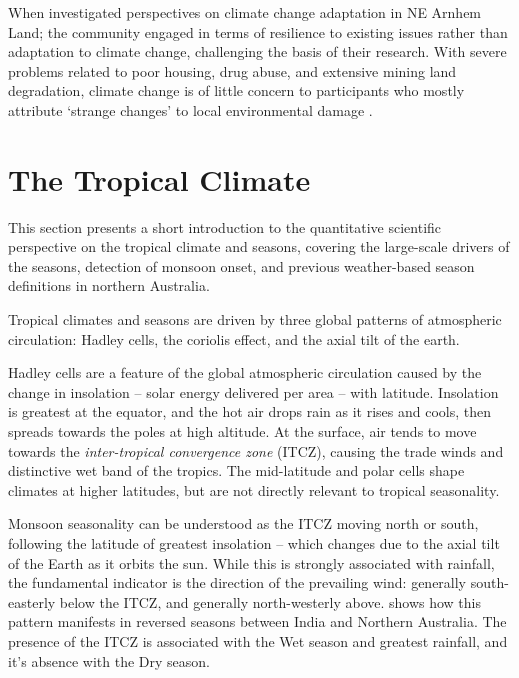 
When \citet{petheram2010} investigated perspectives on climate change
adaptation in NE Arnhem Land; the community engaged in terms of resilience to
existing issues rather than adaptation to climate change, challenging the basis
of their research.  With severe problems related to poor housing, drug abuse,
and extensive mining land degradation, climate change is of little concern to
participants who mostly attribute `strange changes' to local environmental
damage \citep{green2010a}.




\section{The Tropical Climate}
\label{sec:lit-tropical-climate}

This section presents a short introduction to the quantitative scientific
perspective on the tropical climate and seasons, covering the large-scale
drivers of the seasons, detection of monsoon onset, and previous
weather-based season definitions in northern Australia.


Tropical climates and seasons are driven by three global patterns of
atmospheric circulation:  Hadley cells, the coriolis effect, and the axial
tilt of the earth.

Hadley cells are a feature of the global atmospheric circulation
caused by the change in insolation -- solar energy delivered per area --
with latitude.  Insolation is greatest at the equator, and the hot air drops
rain as it rises and cools, then spreads towards the poles at high altitude.
At the surface, air tends to move towards the \textit{inter-tropical
convergence zone} (ITCZ), causing the trade winds and distinctive wet band
of the tropics.  The mid-latitude and polar cells shape climates at higher
latitudes, but are not directly relevant to tropical seasonality.

Monsoon seasonality can be understood as the ITCZ moving north or south,
following the latitude of greatest insolation -- which changes due to the
axial tilt of the Earth as it orbits the sun.  While this is strongly
associated with rainfall, the fundamental indicator is the direction of
the prevailing wind: generally south-easterly below the ITCZ, and generally
north-westerly above.   shows how this pattern
manifests in reversed seasons between India and Northern Australia.
The presence of the ITCZ is associated with the Wet season and greatest
rainfall, and it's absence with the Dry season.

